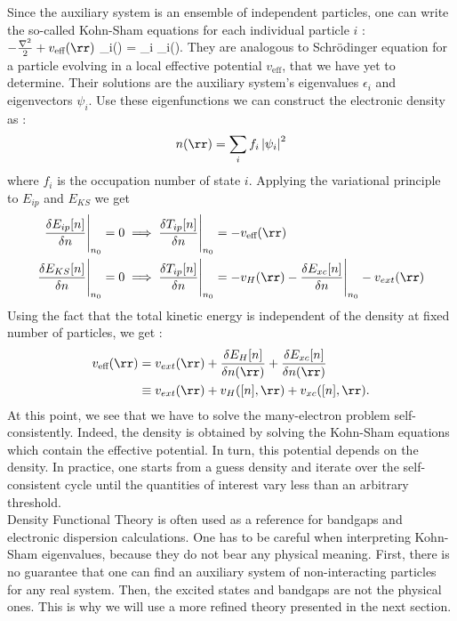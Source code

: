 Since the auxiliary system is an ensemble of independent particles, one can write the so-called Kohn-Sham equations for each individual particle $i$ :
\be
 	\( -\frac{\nabla^2}{2} + v_{\text{eff}}(\rr)\) \psi_i(\rr) = \epsilon_i \psi_i(\rr). \label{eq:KS_eqs}
\ee
They are analogous to Schrödinger equation for a particle evolving in a local effective potential $v_{\text{eff}}$, that we have yet to determine. Their solutions are the auxiliary system's eigenvalues $\epsilon_i$ and eigenvectors $\psi_i$. Use these eigenfunctions we can construct the electronic density as  :
\begin{equation}
 	n(\rr) = \sum_i f_i \left| \psi_i\right|^2 \label{eq:DFT_n_vs_psi}
\end{equation}
where $f_i$ is the occupation number of state $i$. 
Applying the variational principle to $E_{ip}$ and $E_{KS}$ we get 
\begin{align}
    \frac{\delta E_{ip}[n]}{\delta n} \Biggr|_{n_0} = 0 &\implies \frac{\delta T_{ip}[n]}{\delta n} \Biggr|_{n_0} = - v_{\text{eff}}(\rr) \\
    \frac{\delta E_{KS}[n]}{\delta n} \Biggr|_{n_0} = 0 &\implies \frac{\delta T_{ip}[n]}{\delta n} \Biggr|_{n_0} = - v_H(\rr) - \frac{\delta E_{xc}[n]}{\delta n} \Biggr|_{n_0} - v_{ext}(\rr)
\end{align}
Using the fact that the total kinetic energy is independent of the density at fixed number of particles, we get :
\begin{align}
\begin{split}
	v_{\text{eff}}(\rr) &= v_{ext}(\rr) + \frac{\delta E_H[n]}{\delta n(\rr)} + \frac{\delta E_{xc}[n]}{\delta n(\rr)} \\
	&\equiv v_{ext}(\rr) + v_H([n],\rr) + v_{xc}([n],\rr). \label{eq:KS_potential}
\end{split}
\end{align}
At this point, we see that we have to solve the many-electron problem self-consistently. Indeed, the density is obtained by solving the Kohn-Sham equations which contain the effective potential. In turn, this potential depends on the density. In practice, one starts from a guess density and iterate over the self-consistent cycle until the quantities of interest vary less than an arbitrary threshold. \\
Density Functional Theory is often used as a reference for bandgaps and electronic dispersion calculations. One has to be careful when interpreting Kohn-Sham eigenvalues, because they do not bear any physical meaning. First, there is no guarantee that one can find an auxiliary system of non-interacting particles for any real system. Then, the excited states and bandgaps are not the physical ones.\cite{fiolhais2003primer} This is why we will use a more refined theory presented in the next section.

